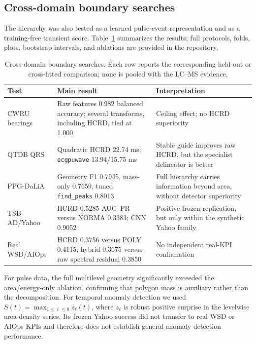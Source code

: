 \subsection{Cross-domain boundary searches}
The hierarchy was also tested as a learned pulse-event representation and as a
training-free transient score. Table~\ref{tab:cross-domain-boundaries}
summarizes the results; full protocols, folds, plots, bootstrap intervals, and
ablations are provided in the repository.

\begin{table}[H]
\centering
\caption{Cross-domain boundary searches. Each row reports the corresponding
held-out or cross-fitted comparison; none is pooled with the LC--MS evidence.}
\label{tab:cross-domain-boundaries}
\small
\begin{tabular}{>{\raggedright\arraybackslash}p{2.5cm}>{\raggedright\arraybackslash}p{4.8cm}>{\raggedright\arraybackslash}p{5.5cm}}
\toprule
Test & Main result & Interpretation \\
\midrule
CWRU bearings \citep{smith2015cwru} & Raw features 0.982 balanced accuracy;
several transforms, including HCRD, tied at 1.000 & Ceiling effect; no HCRD
superiority \\
QTDB QRS \citep{laguna1997qtdb,jane1997ecgpuwave} & Quadratic HCRD 22.74 ms;
\texttt{ecgpuwave} 13.94/15.75 ms & Stable guide improves raw HCRD, but the
specialist delineator is better \\
PPG-DaLiA \citep{reiss2019ppgdalia} & Geometry F1 0.7945, mass-only 0.7659,
tuned \texttt{find\_peaks} 0.8013 & Full hierarchy carries information beyond
area, without detector superiority \\
TSB-AD/Yahoo \citep{liu2024elephant,paparrizos2022tsb} & HCRD 0.5285 AUC--PR
versus NORMA 0.3383; CNN 0.9052 & Positive frozen replication, but only within
the synthetic Yahoo family \\
Real WSD/AIOps \citep{li2022aiops} & HCRD 0.3756 versus POLY 0.4115; hybrid
0.3675 versus raw spectral residual 0.3850 & No independent real-KPI
confirmation \\
\bottomrule
\end{tabular}
\end{table}

For pulse data, the full multilevel geometry significantly exceeded the
area/energy-only ablation, confirming that polygon mass is auxiliary rather
than the decomposition.  For temporal anomaly detection we used
$S(t)=\max_{1\leq\ell\leq8}z_\ell(t)$, where $z_\ell$ is robust positive
surprise in the levelwise area-density series.  Its frozen Yahoo success did
not transfer to real WSD or AIOps KPIs and therefore does not establish general
anomaly-detection performance.



